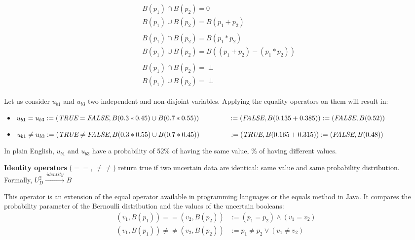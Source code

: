 \begin{align}
	\tag{Disjoint var.}
	\begin{split}
		& B(p_1) \cap B(p_2) = 0\\
		& B(p_1) \cup B(p_2) = B(p_1 + p_2)
	\end{split}\\
	\tag{Indep. and non-disjoint var.}
	\begin{split}
		& B(p_1) \cap B(p_2) = B(p_1 * p_2)\\
		& B(p_1) \cup B(p_2) = B((p_1 + p_2) - (p_1 * p_2))
	\end{split}\\
	\tag{Dep. and non-disjoint var.}
	\begin{split}
		& B(p_1) \cap B(p_2) = \perp\\
		& B(p_1) \cup B(p_2) = \perp
	\end{split}
\end{align}

Let us consider $u_{b1}$ and $u_{b3}$ two independent and non-disjoint variables.
Applying the equality operators on them will result in:
\begin{itemize}
	\vspace{-0.5em}
	\setlength\itemsep{-0.3em}
	\item $u_{b1} = u_{b3} := (\textit{TRUE}{} = \textit{FALSE}{}, B(0.3*0.45) \cup B(0.7*0.55))\\ ~~~~~~~~~~~~~ := (\textit{FALSE}{}, B(0.135 + 0.385)) := (\textit{FALSE}{}, B(0.52))$
	\item $u_{b1} \ne u_{b3} := (\textit{TRUE}{} \ne \textit{FALSE}{}, B(0.3*0.55) \cup B(0.7*0.45))\\ ~~~~~~~~~~~~~ := (\textit{TRUE}{}, B(0.165 + 0.315)) := (\textit{FALSE}{}, B(0.48))$
\end{itemize}
In plain English, $u_{b1}$ and $u_{b3}$ have a probability of 52\% of having the same value, \% of having different values.

\begin{operator}
	\label{op:s-equality}
	\textbf{Identity operators} ($==$, $\neq\neq$) return true if two uncertain data are identical: same value and same probability distribution. Formally, $U_D^2 \xrightarrow{~identity~} B$
\end{operator}

This operator is an extension of the equal operator available in programming languages or the equals method in Java.
It compares the probability parameter of the Bernoulli distribution and the values of the uncertain booleans:
\begin{align*}
	(v_1, B(p_1)) == (v_2, B(p_2)) &:= (p_1 = p_2) \land (v_1 = v_2)\\
	(v_1, B(p_1)) \ne\ne (v_2, B(p_2)) &:= p_1 \ne p_2 \lor (v_1 \ne v_2)
\end{align*}

